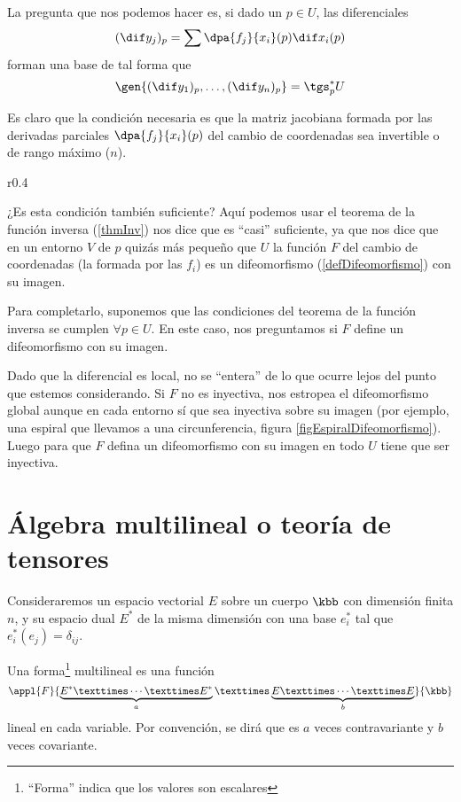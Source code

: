 La pregunta que nos podemos hacer es, si dado un $p ∈ U$, las diferenciales \[ (\dif y_j)_p = \sum \dpa{f_j}{x_i}(p) \dif x_i (p)\] forman una base de tal forma que \[ \gen{(\dif y_1)_p, \dotsc, (\dif y_n)_p} = \tgs_p^* U \]

Es claro que la condición necesaria es que la matriz jacobiana formada por las derivadas parciales $\dpa{f_j}{x_i}(p)$ del cambio de coordenadas sea invertible o de rango máximo ($n$).

\begin{wrapfigure}{r}{0.4\textwidth}
\centering
{}
\caption{La aplicación $F$ que lleva la espiral a la circunferencia cumple el T.F.Inv. en todo punto, pero por no ser inyectiva no hay un difeomorfismo.}
\label{figEspiralDifeomorfismo}
\end{wrapfigure}

¿Es esta condición también suficiente? Aquí podemos usar el teorema de la función inversa (\ref{thmInv}) nos dice que es ``casi'' suficiente, ya que nos dice que en un entorno $V$ de $p$ quizás más pequeño que $U$ la función $F$ del cambio de coordenadas (la formada por las $f_i$) es un difeomorfismo (\ref{defDifeomorfismo}) con su imagen.


Para completarlo, suponemos que las condiciones del teorema de la función inversa se cumplen $∀p ∈ U$. En este caso, nos preguntamos si $F$ define un difeomorfismo con su imagen.

Dado que la diferencial es local, no se ``entera'' de lo que ocurre lejos del punto que estemos considerando. Si $F$ no es inyectiva, nos estropea el difeomorfismo global aunque en cada entorno sí que sea inyectiva sobre su imagen (por ejemplo, una espiral que llevamos a una circunferencia, figura \ref{figEspiralDifeomorfismo}). Luego para que $F$ defina un difeomorfismo con su imagen en todo $U$ tiene que ser inyectiva.

\section{Álgebra multilineal o teoría de tensores}

Consideraremos un espacio vectorial $E$ sobre un cuerpo $\kbb$ con dimensión finita $n$, y su espacio dual $E^*$ de la misma dimensión con una base $e^*_i$ tal que $e_i^*(e_j) = δ_{ij}$.

\begin{defn} Una forma\footnote{``Forma'' indica que los valores son escalares} multilineal es una función \[
\appl{F}{\underbrace{E^* × \dotsb × E^*}_{a} × \underbrace{E × \dotsb × E}_{b}}{\kbb} \] lineal en cada variable. Por convención, se dirá que es $a$ veces contravariante y $b$ veces covariante.
\end{defn}


